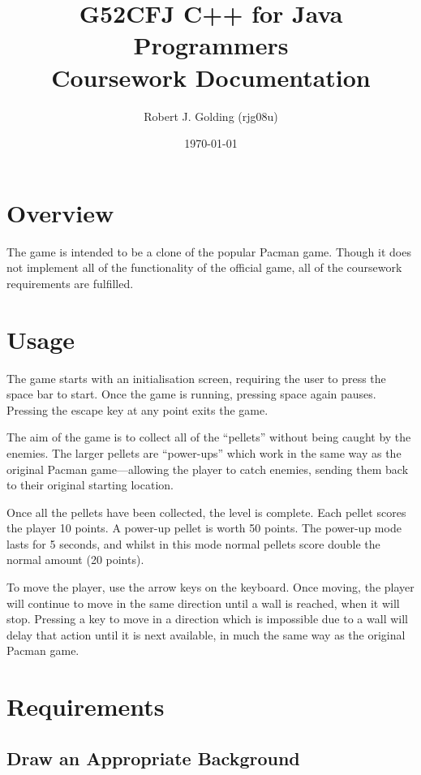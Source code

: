 \documentclass[a4paper,11pt]{article}
\title{G52CFJ C++ for Java Programmers \\ Coursework Documentation}
\author{Robert J. Golding (rjg08u)} \date{\today}
\begin{document}
    \maketitle

    \section{Overview}

    The game is intended to be a clone of the popular Pacman game. Though it
    does not implement all of the functionality of the official game, all of
    the coursework requirements are fulfilled.

    \section{Usage}

    The game starts with an initialisation screen, requiring the user to press
    the space bar to start. Once the game is running, pressing space again
    pauses. Pressing the escape key at any point exits the game.

    The aim of the game is to collect all of the ``pellets'' without being
    caught by the enemies. The larger pellets are ``power-ups'' which work in
    the same way as the original Pacman game---allowing the player to catch
    enemies, sending them back to their original starting location.

    Once all the pellets have been collected, the level is complete. Each
    pellet scores the player 10 points. A power-up pellet is worth 50 points.
    The power-up mode lasts for 5 seconds, and whilst in this mode normal
    pellets score double the normal amount (20 points).

    To move the player, use the arrow keys on the keyboard. Once moving, the
    player will continue to move in the same direction until a wall is reached,
    when it will stop. Pressing a key to move in a direction which is
    impossible due to a wall will delay that action until it is next available,
    in much the same way as the original Pacman game.

    \section{Requirements}

    \subsection{Draw an Appropriate Background}
\end{document}
